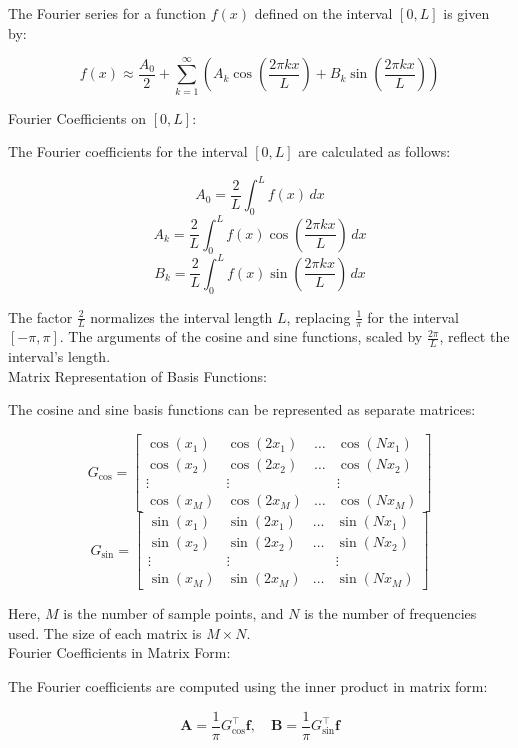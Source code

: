 \documentclass{article}
\begin{document}
\begin{itemize}
{The Fourier series for a function \( f(x) \) defined on the interval \([0, L]\) is given by:

\[
f(x) \approx \frac{A_0}{2} + \sum_{k=1}^\infty \left( A_k \cos\left(\frac{2\pi k x}{L}\right) + B_k \sin\left(\frac{2\pi k x}{L}\right) \right)
\]

Fourier Coefficients on \([0, L]\):

The Fourier coefficients for the interval \([0, L]\) are calculated as follows:

\[
A_0 = \frac{2}{L} \int_0^L f(x) \, dx
\]
\[
A_k = \frac{2}{L} \int_0^L f(x) \cos\left(\frac{2\pi k x}{L}\right) \, dx
\]
\[
B_k = \frac{2}{L} \int_0^L f(x) \sin\left(\frac{2\pi k x}{L}\right) \, dx
\]

The factor \( \frac{2}{L} \) normalizes the interval length \( L \), replacing \( \frac{1}{\pi} \) for the interval \([- \pi, \pi]\). The arguments of the cosine and sine functions, scaled by \( \frac{2\pi}{L} \), reflect the interval's length.\\

Matrix Representation of Basis Functions:

The cosine and sine basis functions can be represented as separate matrices:

\[
G_{\cos} = \begin{bmatrix}
\cos(x_1) & \cos(2x_1) & \dots & \cos(Nx_1) \\
\cos(x_2) & \cos(2x_2) & \dots & \cos(Nx_2) \\
\vdots & \vdots & & \vdots \\
\cos(x_M) & \cos(2x_M) & \dots & \cos(Nx_M)
\end{bmatrix}
\]
\[
G_{\sin} = \begin{bmatrix}
\sin(x_1) & \sin(2x_1) & \dots & \sin(Nx_1) \\
\sin(x_2) & \sin(2x_2) & \dots & \sin(Nx_2) \\
\vdots & \vdots & & \vdots \\
\sin(x_M) & \sin(2x_M) & \dots & \sin(Nx_M)
\end{bmatrix}
\]

Here, \( M \) is the number of sample points, and \( N \) is the number of frequencies used. The size of each matrix is \( M \times N \).\\

Fourier Coefficients in Matrix Form:

The Fourier coefficients are computed using the inner product in matrix form:

\[
\mathbf{A} = \frac{1}{\pi} G_{\cos}^\top \mathbf{f}, \quad \mathbf{B} = \frac{1}{\pi} G_{\sin}^\top \mathbf{f}
\]

}
\end{itemize}
\end{document}

